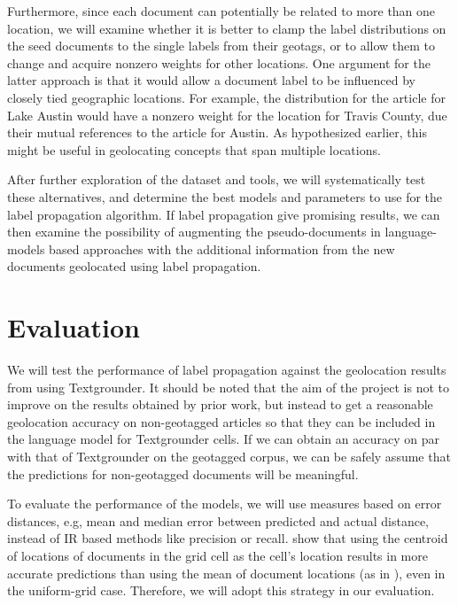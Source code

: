 \documentclass[11pt]{article}
\begin{document}
Furthermore, since each document can potentially be related to more than one location, we will examine whether it is better to clamp the label distributions on the seed documents to the single labels from their geotags, or to allow them to change and acquire nonzero weights for other locations. One argument for the latter approach is that it would allow a document label to be influenced by closely tied geographic locations. For example, the distribution for the article for 
Lake Austin would have a nonzero weight for the location for Travis County, due their mutual references to the article for Austin. As hypothesized earlier, this might be useful in geolocating concepts that span multiple locations.

After further exploration of the dataset and tools, we will systematically test these alternatives, and determine the best models and parameters to use for the label propagation algorithm. If label propagation give promising results, we can then examine the possibility of augmenting the pseudo-documents in language-models based approaches with the additional information from the new documents geolocated using label propagation.



\section{Evaluation}
We will test the performance of label propagation against the geolocation results from \cite{wing-baldridge:11} using Textgrounder. It should be noted that the aim of the project is not to improve on the results obtained by prior work, but instead to get a reasonable geolocation accuracy on non-geotagged articles so that they can be included in the language model for Textgrounder cells. If we can obtain an accuracy on par with that of Textgrounder on the geotagged corpus, we can be safely assume that the predictions for non-geotagged documents will be meaningful.

To evaluate the performance of the models, we will use measures based on error distances, e.g, mean and median error between predicted and actual distance, instead of IR based methods like precision or recall. \cite{rolleretal:12} show that using the centroid of locations of documents in the grid cell as the cell's location results in more accurate predictions than using the mean of document locations (as in \cite{wing-baldridge:11}), even in the uniform-grid case. Therefore, we will adopt this strategy in our evaluation.
\end{document}
